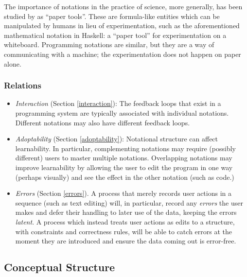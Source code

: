 \documentclass[english,submission]{programming}
\providecommand{\DIFaddbegin}{} %
\providecommand{\DIFaddend}{} %
\providecommand{\DIFdelbegin}{} %
\providecommand{\DIFdelend}{} %
\begin{document}
The importance of notations in the practice of science, more generally,
has been studied by \cite{PaperTools} as ``paper tools''. These are
formula-like entities which can be manipulated by humans in lieu of
experimentation, such as the aforementioned mathematical notation in
Haskell: a ``paper tool'' for experimentation on a whiteboard.
Programming notations are similar, but they are a way of communicating
with a machine; the experimentation does not happen on paper alone.

\DIFdelbegin %
\DIFdelend \DIFaddbegin \hypertarget{relations-1}{%
\subsubsection{Relations}\label{relations-1}}
\DIFaddend 

\begin{itemize}
\tightlist
\item
  \emph{Interaction} (Section \ref{interaction}): The feedback loops
  that exist in a programming system are typically associated with
  individual notations. Different notations may also have different
  feedback loops.
\item
  \emph{Adoptability} (Section \ref{adoptability}): Notational structure
  can affect learnability. In particular, complementing notations may
  require (possibly different) users to master multiple notations.
  Overlapping notations may improve learnability by allowing the user to
  edit the program in one way (perhaps visually) and see the effect in
  the other notation (such as code.)
\item
  \emph{Errors} (Section \ref{errors}). A process that merely records
  user actions in a sequence (such as text editing) will, in particular,
  record any \emph{errors} the user makes and defer their handling to
  later use of the data, keeping the errors \emph{latent}. A process
  which instead treats user actions as edits to a structure, with
  constraints and correctness rules, will be able to catch errors at the
  moment they are introduced and ensure the data coming out is
  error-free.
\end{itemize}

\hypertarget{conceptual-structure}{%
\subsection{Conceptual Structure}\label{conceptual-structure}}
\end{document}
